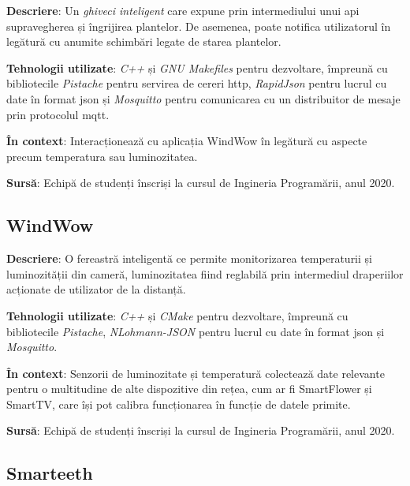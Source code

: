 \textbf{Descriere}:  Un \textit{ghiveci inteligent} care expune prin intermediului unui \acrshort{api} supravegherea și îngrijirea plantelor. De asemenea, poate notifica utilizatorul în legătură cu anumite schimbări legate de starea plantelor.

\textbf{Tehnologii utilizate}: \textit{C++} și \textit{GNU Makefiles} pentru dezvoltare, împreună cu bibliotecile \textit{Pistache} pentru servirea de cereri \acrfull{http}, \textit{RapidJson} pentru lucrul cu date în format \acrfull{json} și \textit{Mosquitto} pentru comunicarea cu un distribuitor de mesaje prin protocolul \acrfull{mqtt}. 

\textbf{În context}: Interacționează cu aplicația WindWow în legătură cu aspecte precum temperatura sau luminozitatea.

\textbf{Sursă}: Echipă de studenți înscriși la cursul de Ingineria Programării, anul 2020.

\subsection*{WindWow}

\textbf{Descriere}:  O fereastră inteligentă ce permite monitorizarea temperaturii și luminozității din cameră, luminozitatea fiind reglabilă prin intermediul draperiilor acționate de utilizator de la distanță.

\textbf{Tehnologii utilizate}: \textit{C++} și \textit{CMake} pentru dezvoltare, împreună cu bibliotecile \textit{Pistache}, \textit{NLohmann-JSON} pentru lucrul cu date în format \acrshort{json} și \textit{Mosquitto}.

\textbf{În context}: Senzorii de luminozitate și temperatură colectează date relevante pentru o multitudine de alte dispozitive din rețea, cum ar fi SmartFlower și SmartTV, care își pot calibra funcționarea în funcție de datele primite.

\textbf{Sursă}: Echipă de studenți înscriși la cursul de Ingineria Programării, anul 2020.

\subsection*{Smarteeth}

